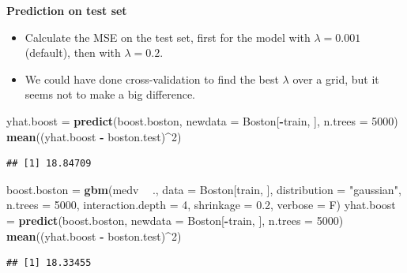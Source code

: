 \documentclass[10pt,ignorenonframetext,]{beamer}
\newenvironment{Shaded}{\begin{snugshade}}{\end{snugshade}}
\newcommand{\KeywordTok}[1]{\textcolor[rgb]{0.13,0.29,0.53}{\textbf{#1}}}
\newcommand{\DataTypeTok}[1]{\textcolor[rgb]{0.13,0.29,0.53}{#1}}
\newcommand{\DecValTok}[1]{\textcolor[rgb]{0.00,0.00,0.81}{#1}}
\newcommand{\FloatTok}[1]{\textcolor[rgb]{0.00,0.00,0.81}{#1}}
\newcommand{\StringTok}[1]{\textcolor[rgb]{0.31,0.60,0.02}{#1}}
\newcommand{\OperatorTok}[1]{\textcolor[rgb]{0.81,0.36,0.00}{\textbf{#1}}}
\newcommand{\NormalTok}[1]{#1}
\begin{document}
\begin{frame}[fragile]

\textbf{Prediction on test set}

\begin{itemize}
\item
  Calculate the MSE on the test set, first for the model with
  \(\lambda=0.001\) (default), then with \(\lambda=0.2\).
\item
  We could have done cross-validation to find the best \(\lambda\) over
  a grid, but it seems not to make a big difference.
\end{itemize}

\scriptsize

\begin{Shaded}
\begin{Highlighting}[]
\NormalTok{yhat.boost =}\StringTok{ }\KeywordTok{predict}\NormalTok{(boost.boston, }\DataTypeTok{newdata =}\NormalTok{ Boston[}\OperatorTok{-}\NormalTok{train, ], }\DataTypeTok{n.trees =} \DecValTok{5000}\NormalTok{)}
\KeywordTok{mean}\NormalTok{((yhat.boost }\OperatorTok{-}\StringTok{ }\NormalTok{boston.test)}\OperatorTok{^}\DecValTok{2}\NormalTok{)}
\end{Highlighting}
\end{Shaded}

\begin{verbatim}
## [1] 18.84709
\end{verbatim}

\begin{Shaded}
\begin{Highlighting}[]
\NormalTok{boost.boston =}\StringTok{ }\KeywordTok{gbm}\NormalTok{(medv }\OperatorTok{~}\StringTok{ }\NormalTok{., }\DataTypeTok{data =}\NormalTok{ Boston[train, ], }\DataTypeTok{distribution =} \StringTok{"gaussian"}\NormalTok{, }
    \DataTypeTok{n.trees =} \DecValTok{5000}\NormalTok{, }\DataTypeTok{interaction.depth =} \DecValTok{4}\NormalTok{, }\DataTypeTok{shrinkage =} \FloatTok{0.2}\NormalTok{, }\DataTypeTok{verbose =}\NormalTok{ F)}
\NormalTok{yhat.boost =}\StringTok{ }\KeywordTok{predict}\NormalTok{(boost.boston, }\DataTypeTok{newdata =}\NormalTok{ Boston[}\OperatorTok{-}\NormalTok{train, ], }\DataTypeTok{n.trees =} \DecValTok{5000}\NormalTok{)}
\KeywordTok{mean}\NormalTok{((yhat.boost }\OperatorTok{-}\StringTok{ }\NormalTok{boston.test)}\OperatorTok{^}\DecValTok{2}\NormalTok{)}
\end{Highlighting}
\end{Shaded}

\begin{verbatim}
## [1] 18.33455
\end{verbatim}

\end{frame}
\end{document}
